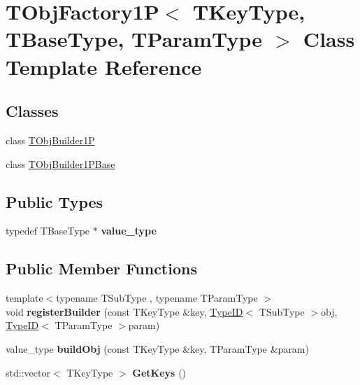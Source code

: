 \hypertarget{class_t_obj_factory1_p}{\section{T\+Obj\+Factory1\+P$<$ T\+Key\+Type, T\+Base\+Type, T\+Param\+Type $>$ Class Template Reference}
\label{class_t_obj_factory1_p}
}
\subsection*{Classes}
\begin{DoxyCompactItemize}
\item 
class \hyperlink{class_t_obj_factory1_p_1_1_t_obj_builder1_p}{T\+Obj\+Builder1\+P}
\item 
class \hyperlink{class_t_obj_factory1_p_1_1_t_obj_builder1_p_base}{T\+Obj\+Builder1\+P\+Base}
\end{DoxyCompactItemize}
\subsection*{Public Types}
\begin{DoxyCompactItemize}
\item 
\hypertarget{class_t_obj_factory1_p_a2adca32b3bd013e25e6256f319db4498}{typedef T\+Base\+Type $\ast$ {\bfseries value\+\_\+type}}\label{class_t_obj_factory1_p_a2adca32b3bd013e25e6256f319db4498}

\end{DoxyCompactItemize}
\subsection*{Public Member Functions}
\begin{DoxyCompactItemize}
\item 
\hypertarget{class_t_obj_factory1_p_a2d9384bd20a44103fe5967b25483c003}{{\footnotesize template$<$typename T\+Sub\+Type , typename T\+Param\+Type $>$ }\\void {\bfseries register\+Builder} (const T\+Key\+Type \&key, \hyperlink{class_type_i_d}{Type\+I\+D}$<$ T\+Sub\+Type $>$obj, \hyperlink{class_type_i_d}{Type\+I\+D}$<$ T\+Param\+Type $>$param)}\label{class_t_obj_factory1_p_a2d9384bd20a44103fe5967b25483c003}

\item 
\hypertarget{class_t_obj_factory1_p_aacdcfb2d08b8c26810238f3125a3e1c9}{value\+\_\+type {\bfseries build\+Obj} (const T\+Key\+Type \&key, T\+Param\+Type \&param)}\label{class_t_obj_factory1_p_aacdcfb2d08b8c26810238f3125a3e1c9}

\item 
\hypertarget{class_t_obj_factory1_p_a2c3e9e59dc7a1f7cb7e5021f5ce3cddf}{std\+::vector$<$ T\+Key\+Type $>$ {\bfseries Get\+Keys} ()}\label{class_t_obj_factory1_p_a2c3e9e59dc7a1f7cb7e5021f5ce3cddf}

\end{DoxyCompactItemize}
